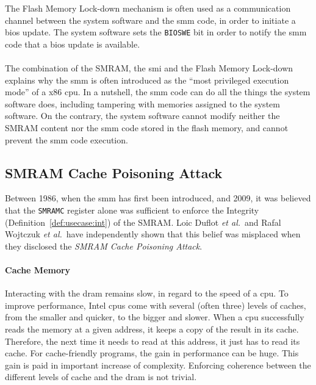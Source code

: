 The Flash Memory Lock-down mechanism is often used as a communication channel
between the system software and the \ac{smm} code, in order to initiate a
\ac{bios} update.
%
The system software sets the \texttt{BIOSWE} bit in order to notify the \ac{smm} code
that a \ac{bios} update is available.

\paragraph{}
%
The combination of the SMRAM, the \ac{smi} and the Flash Memory Lock-down
explains why the \ac{smm} is often introduced as the ``most privileged execution
mode'' of a x86 \ac{cpu}.
%
In a nutshell, the \ac{smm} code can do all the things the system software does,
including tampering with memories assigned to the system software.
%
On the contrary, the system software cannot modify neither the SMRAM content nor
the \ac{smm} code stored in the flash memory, and cannot prevent the \ac{smm}
code execution.

\subsection{SMRAM Cache Poisoning Attack} %
\label{subsec:usecase:hse:smram}

Between 1986, when the \ac{smm} has first been introduced, and 2009, it was
believed that the \texttt{SMRAMC} register alone was sufficient to enforce the
Integrity (Definition~\ref{def:usecase:int}) of the SMRAM.
%
Loic Duflot \emph{et al.}\,\cite{duflot2009smram} and Rafal Wojtczuk \emph{et
  al.}\,\cite{wojtczuk2009smram} have independently shown that this belief was
misplaced when they disclosed the \emph{SMRAM Cache Poisoning Attack}.

\paragraph{Cache Memory}

Interacting with the \ac{dram} remains slow, in regard to the speed of a
\ac{cpu}.
%
To improve performance, Intel \acp{cpu} come with several (often three) levels
of caches, from the smaller and quicker, to the bigger and slower.
%
When a \ac{cpu} successfully reads the memory at a given address, it keeps a
copy of the result in its cache.
%
Therefore, the next time it needs to read at this address, it just has to read
its cache.
%
For cache-friendly programs, the gain in performance can be huge.
%
This gain is paid in important increase of complexity.
%
Enforcing coherence between the different levels of cache and the \ac{dram} is
not trivial.

